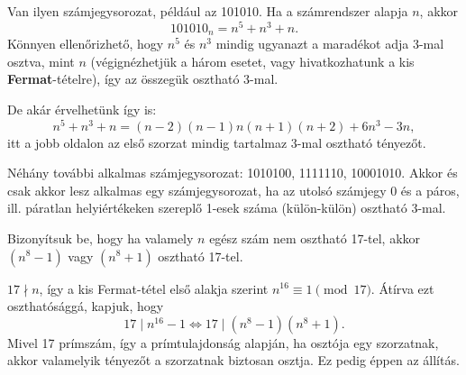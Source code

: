 \bigskip{}

\begin{solution}
	Van ilyen számjegysorozat, például az 101010. Ha a számrendszer alapja
	$n$, akkor 
	\[
	101010_{n}=n^{5}+n^{3}+n.
	\]
	Könnyen ellenőrizhető, hogy $n^{5}$ és $n^{3}$ mindig ugyanazt a
	maradékot adja 3-mal osztva, mint $n$ (végignézhetjük a három esetet,
	vagy hivatkozhatunk a kis \textbf{Fermat}-tételre), így az összegük
	osztható 3-mal.
	
	De akár érvelhetünk így is: 
	\[
	n^{5}+n^{3}+n=(n-2)(n-1)n(n+1)(n+2)+6n^{3}-3n,
	\]
	itt a jobb oldalon az első szorzat mindig tartalmaz 3-mal osztható
	tényezőt.
	
	Néhány további alkalmas számjegysorozat: 1010100, 1111110, 10001010.
	Akkor és csak akkor lesz alkalmas egy számjegysorozat, ha az utolsó
	számjegy 0 és a páros, ill. páratlan helyiértékeken szereplő 1-esek
	száma (külön-külön) osztható 3-mal.
\end{solution}
\begin{extraproblem}
	Bizonyítsuk be, hogy ha valamely $n$ egész szám nem osztható 17-tel,
	akkor $(n^{8}-1)$ vagy $(n^{8}+1)$ osztható 17-tel.
\end{extraproblem}

\bigskip{}

\begin{solution}
	$17\nmid n$, így a kis Fermat-tétel első alakja szerint
	$n^{16}\equiv1\pmod{17}$. Átírva ezt oszthatósággá, kapjuk, hogy
	\[
	17\mid n^{16}-1\Longleftrightarrow17\mid(n^{8}-1)(n^{8}+1).
	\]
	Mivel 17 prímszám, így a prímtulajdonság alapján, ha osztója egy szorzatnak,
	akkor valamelyik tényezőt a szorzatnak biztosan osztja. Ez pedig éppen
	az állítás.
\end{solution}




%
%
%

